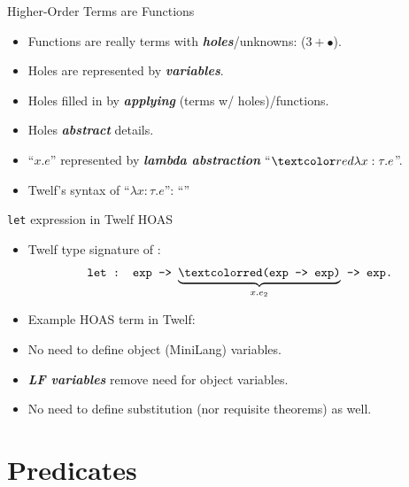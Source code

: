\documentclass{beamer}
\renewcommand{\emph}[1]{\textbf{\textit{#1}}}
\begin{document}
\begin{frame}{Higher-Order Terms are Functions}
\begin{itemize}
\item Functions are really terms with \emph{holes}/unknowns:
($3 + \bullet$).

\pause
\item Holes are represented by \emph{variables}.
\item Holes filled in by \emph{applying} (terms w/ holes)/functions.
\item Holes \emph{abstract} details.

\pause
\item ``$x.e$'' represented by \emph{lambda abstraction}
      ``$\cemph{\lambda x:\tau.e}$''.
\item Twelf's syntax of ``$\lambda x:\tau.e$'':
      ``\texttt{}''
\end{itemize}
\end{frame}


\begin{frame}{\texttt{let} expression in Twelf HOAS}
\begin{itemize}
\item Twelf type signature of :
\[ \texttt{let : exp -> $\underbrace{\texttt{\cemph{(exp -> exp)}}}_{x.e_2}$ -> exp.} \]

\pause
\item Example HOAS term in Twelf:

\begin{center}
\end{center}

\pause
\item No need to define object (MiniLang) variables.
\item \emph{LF variables} remove need for object variables.
\item No need to define substitution (nor requisite theorems)
as well.
\end{itemize}
\end{frame}


\section{Predicates}
\end{document}
